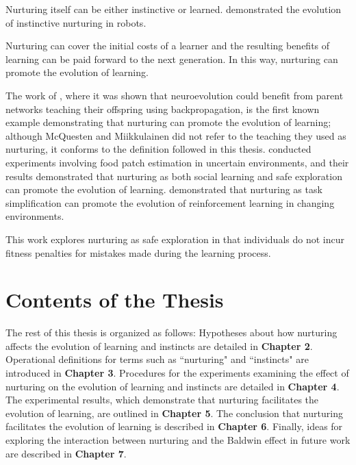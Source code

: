 \documentclass[master]{outhesis}
\begin{document}
Nurturing itself can be either instinctive or learned.
\citet{Leonce:2012aa} demonstrated the evolution of instinctive nurturing in robots.


Nurturing can cover the initial costs of a learner and the resulting benefits of learning can be paid forward to the next generation.
In this way, nurturing can promote the evolution of learning.

The work of \citet{McQuesten:1997aa},
where it was shown that neuroevolution could benefit from parent networks teaching their offspring using backpropagation,
is the first known example demonstrating that nurturing can promote the evolution of learning;
although McQuesten and Miikkulainen did not refer to the teaching they used as nurturing,
it conforms to the definition followed in this thesis.
\citet{Eskridge:2012aa} conducted experiments involving food patch estimation in uncertain environments,
and their results demonstrated that nurturing as both social learning and safe exploration can promote the evolution of learning.
\citet{Shah:2015hs} demonstrated that nurturing as task simplification can promote the evolution of reinforcement learning in changing environments.

This work explores nurturing as safe exploration in that individuals do not incur fitness penalties for mistakes made during the learning process.

\section{Contents of the Thesis}

The rest of this thesis is organized as follows:
Hypotheses about how nurturing affects the evolution of learning and instincts are detailed in \textbf{Chapter 2}. 
Operational definitions for terms such as ``nurturing" and ``instincts" are introduced in \textbf{Chapter 3}.
Procedures for the experiments examining the effect of nurturing on the evolution of learning and instincts are detailed in \textbf{Chapter 4}.
The experimental results, which demonstrate that nurturing facilitates the evolution of learning, are outlined in \textbf{Chapter 5}. 
The conclusion that nurturing facilitates the evolution of learning is described in \textbf{Chapter 6}. 
Finally, ideas for exploring the interaction between nurturing and the Baldwin effect in future work are described in \textbf{Chapter 7}.
\end{document}
